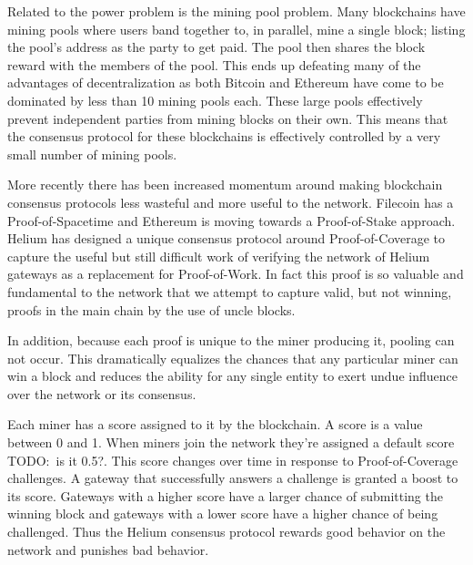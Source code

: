 \documentclass[letterpaper,11pt]{article}
\newcommand{\todo}[1]{}
\renewcommand{\todo}[1]{{\color{red} TODO:\ {#1}}}
\begin{document}
Related to the power problem is the mining pool problem. Many blockchains have mining pools where users band together to, in parallel, mine a single block; listing the pool's address as the party to get paid. The pool then shares the block reward with the members of the pool. This ends up defeating many of the advantages of decentralization as both Bitcoin and Ethereum have come to be dominated by less than 10 mining pools each. These large pools effectively prevent independent parties from mining blocks on their own. This means that the consensus protocol for these blockchains is effectively controlled by a very small number of mining pools.

More recently there has been increased momentum around making blockchain consensus protocols less wasteful and more useful to the network. Filecoin has a Proof-of-Spacetime and Ethereum is moving towards a Proof-of-Stake approach. Helium has designed a unique consensus protocol around Proof-of-Coverage to capture the useful but still difficult work of verifying the network of Helium gateways as a replacement for Proof-of-Work. In fact this proof is so valuable and fundamental to the network that we attempt to capture valid, but not winning, proofs in the main chain by the use of uncle blocks.

In addition, because each proof is unique to the miner producing it, pooling can not occur. This dramatically equalizes the chances that any particular miner can win a block and reduces the ability for any single entity to exert undue influence over the network or its consensus.

Each miner has a score assigned to it by the blockchain. A score is a value between 0 and 1. When miners join the network they're assigned a default score \todo{is it 0.5?}. This score changes over time in response to Proof-of-Coverage challenges. A gateway that successfully answers a challenge is granted a boost to its score. Gateways with a higher score have a larger chance of submitting the winning block and gateways with a lower score have a higher chance of being challenged. Thus the Helium consensus protocol rewards good behavior on the network and punishes bad behavior.
\end{document}
